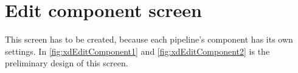 
\section{Edit component screen}
This screen has to be created, because each pipeline's component has its own settings.
In \autoref{fig:xdEditComponent1} and \autoref{fig:xdEditComponent2} is the preliminary design of this screen.

